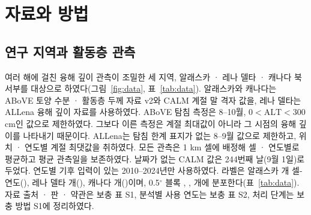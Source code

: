 \section{자료와 방법}\label{sec:methods}

\subsection{연구 지역과 활동층 관측}
여러 해에 걸친 융해 깊이 관측이 조밀한 세 지역, 알래스카 · 레나 델타 · 캐나다 북서부를 대상으로 하였다(그림~\ref{fig:data}, 표~\ref{tab:data}). 알래스카와 캐나다는 ABoVE 토양 수분 · 활동층 두께 자료 v2\cite{Moore2025}와 CALM 계절 말 격자 값\cite{Streletskiy2025}을, 레나 델타는 ALLena 융해 깊이 자료\cite{Veremeeva2025}를 사용하였다. ABoVE 탐침 측정은 8--10월, $0<\mathrm{ALT}<300$ cm인 값으로 제한하였다. 그보다 이른 측정은 계절 최대값이 아니라 그 시점의 융해 깊이를 나타내기 때문이다. ALLena는 탐침 한계 표지가 없는 8--9월 값으로 제한하고, 위치 · 연도별 계절 최댓값을 취하였다. 모든 관측은 1 km 셀에 배정해 셀 · 연도별로 평균하고 평균 관측일을 보존하였다. 날짜가 없는 CALM 값은 244번째 날(9월 1일)로 두었다. 연도별 기후 입력이 있는 2010--2024년만 사용하였다. 라벨은 알래스카 \nncyAk{}개 셀-연도(\nyrsAkko), 레나 델타 \nncyLe{}개(\nyrsLeko), 캐나다 \nncyCa{}개(\nyrsCako)이며, 0.5$^\circ$ 블록 \nnblkAk, \nnblkLe, \nnblkCa{}개에 분포한다(표~\ref{tab:data}). 자료 출처 · 판 · 약관은 보충 표 S1, 분석별 사용 연도는 보충 표 S2, 처리 단계는 보충 방법 S1에 정리하였다.




